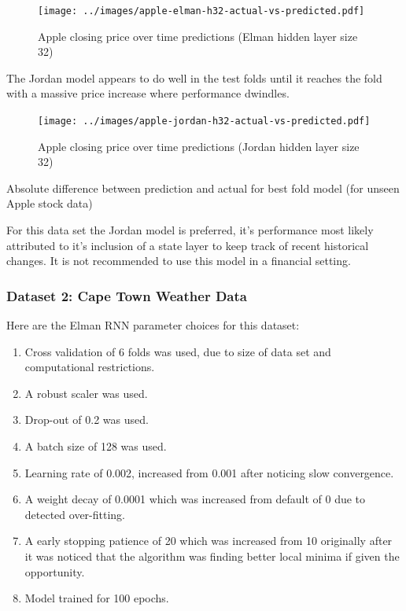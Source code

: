 \documentclass[conference]{IEEEtran}
\begin{document}
\begin{figure}[H] 
	\centering
	\texttt{[image: ../images/apple-elman-h32-actual-vs-predicted.pdf]}
	\caption{Apple closing price over time predictions (Elman hidden layer size 32)}
	\label{fig:apple-closing-predictions}
\end{figure}

The Jordan model appears to do well in the test folds until it reaches the fold with a massive price increase where performance dwindles.

\begin{figure}[H] 
	\centering
	\texttt{[image: ../images/apple-jordan-h32-actual-vs-predicted.pdf]}
	\caption{Apple closing price over time predictions (Jordan hidden layer size 32)}
	\label{fig:apple-closing-predictions-jordan}
\end{figure}

\begin{table}[H]
	\caption{Absolute difference between prediction and actual for best fold model (for unseen Apple stock data)}
	\label{tab:apple-rnn-summary}
\end{table}


For this data set the Jordan model is preferred, it's performance most likely attributed to it's inclusion of a state layer to keep track of recent historical changes. It is not recommended to use this model in a financial setting.


\subsubsection{Dataset 2: Cape Town Weather Data}

Here are the Elman RNN parameter choices for this dataset:

\begin{enumerate}[]
	\item Cross validation of 6 folds was used, due to size of data set and computational restrictions.
	\item A robust scaler was used.
	\item Drop-out of 0.2 was used.
	\item A batch size of 128 was used.
	\item Learning rate of 0.002, increased from 0.001 after noticing slow convergence.
	\item A weight decay of 0.0001 which was increased from default of 0 due to detected over-fitting.
	\item A early stopping patience of 20 which was increased from 10 originally after it was noticed that the algorithm was finding better local minima if given the opportunity.
	\item Model trained for 100 epochs.
\end{enumerate}
\end{document}
